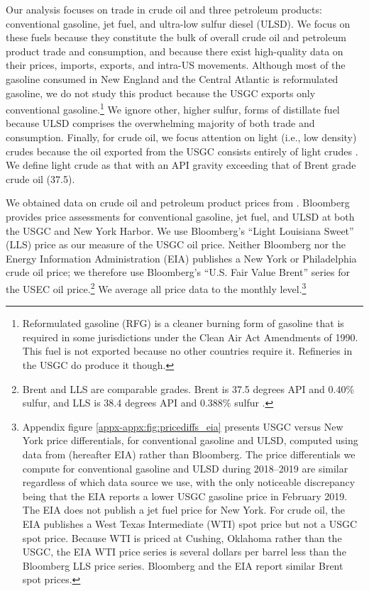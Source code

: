 \documentclass[12pt]{article}
\begin{document}
Our analysis focuses on trade in crude oil and three petroleum products: conventional gasoline, jet fuel, and ultra-low sulfur diesel (ULSD). We focus on these fuels because they constitute the bulk of overall crude oil and petroleum product trade and consumption, and because there exist high-quality data on their prices, imports, exports, and intra-US movements. Although most of the gasoline consumed in New England and the Central Atlantic is reformulated gasoline, we do not study this product because the USGC exports only conventional gasoline.\footnote{Reformulated gasoline (RFG) is a cleaner burning form of gasoline that is required in some jurisdictions under the Clean Air Act Amendments of 1990. This fuel is not exported because no other countries require it. Refineries in the USGC do produce it though.} We ignore other, higher sulfur, forms of distillate fuel because ULSD comprises the overwhelming majority of both trade and consumption. Finally, for crude oil, we focus attention on light (i.e., low density) crudes because the oil exported from the USGC consists entirely of light crudes \citep{SPglobal_exports_2018}. We define light crude as that with an API gravity exceeding that of Brent grade crude oil (37.5).

We obtained data on crude oil and petroleum product prices from \cite{Bloomberg2023}. Bloomberg provides price assessments for conventional gasoline, jet fuel, and ULSD at both the USGC and New York Harbor. We use Bloomberg's ``Light Louisiana Sweet'' (LLS) price as our measure of the USGC oil price. Neither Bloomberg nor the Energy Information Administration (EIA) publishes a New York or Philadelphia crude oil price; we therefore use Bloomberg's ``U.S. Fair Value Brent'' series for the USEC oil price.\footnote{Brent and LLS are comparable grades. Brent is 37.5 degrees API and 0.40\% sulfur, and LLS is 38.4 degrees API and 0.388\% sulfur \citep{SPglobal_2017}.} We average all price data to the monthly level.\footnote{Appendix figure \ref{appx-appx:fig:pricediffs_eia} presents USGC versus New York price differentials, for conventional gasoline and ULSD, computed using data from \citet{EIApetroleum} (hereafter EIA) rather than Bloomberg. The price differentials we compute for conventional gasoline and ULSD during 2018--2019 are similar regardless of which data source we use, with the only noticeable discrepancy being that the EIA reports a lower USGC gasoline price in February 2019. The EIA does not publish a jet fuel price for New York.  For crude oil, the EIA publishes a West Texas Intermediate (WTI) spot price but not a USGC spot price. Because WTI is priced at Cushing, Oklahoma rather than the USGC, the EIA WTI price series is several dollars per barrel less than the Bloomberg LLS price series. Bloomberg and the EIA report similar Brent spot prices.}
\end{document}

